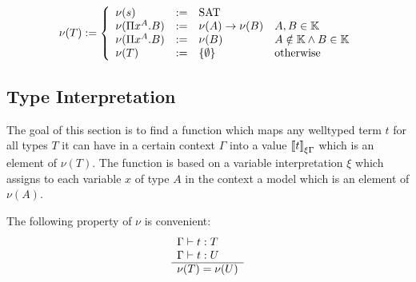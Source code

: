 \begin{definition}
$$
    \nu(T) :=
    \left \{
    \begin{array}{llll}
        \nu(s) &:=& \text{SAT}
        \\
        \nu(\Pi x^A. B) &:=& \nu(A)\to \nu(B) & A,B \in \mathbb{K}
        \\
        \nu(\Pi x^A. B) &:=& \nu(B) & A \notin \mathbb{K} \land B \in \mathbb{K}
        \\
        \nu (T) &:=& {\{\emptyset\}} &\text{otherwise}
    \end{array}
    \right.
$$
\end{definition}


\subsection{Type Interpretation}

The goal of this section is to find a function which maps any welltyped term $t$
for all types $T$ it can have in a certain context $\Gamma$ into a value
${{[\![} t{]\!]}}_{\xi\Gamma}$ which is an element of $\nu (T)$. The function is
based on a variable interpretation $\xi$ which assigns to each variable $x$ of
type $A$ in the context a model which is an element of $\nu(A)$.

The following property of $\nu$ is convenient:
$$
    \begin{array}{l} 
        \Gamma \vdash t: T
        \\
        \Gamma \vdash t: U
     \\ \hline 
        \nu(T) = \nu(U)
    \end{array}
$$
